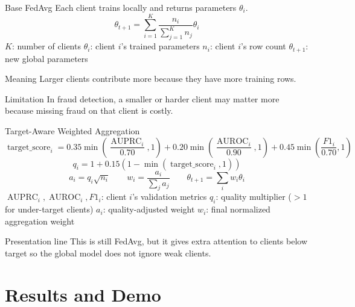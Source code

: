 \documentclass[aspectratio=169,10pt]{beamer}
\begin{document}
\begin{frame}{Base FedAvg}
  Each client trains locally and returns parameters \(\theta_i\).
  \[
    \theta_{t+1}
    =
    \sum_{i=1}^{K}
    \frac{n_i}{\sum_{j=1}^{K} n_j}
    \theta_i
  \]
  \footnotesize \(K\): number of clients \quad \(\theta_i\): client \(i\)'s trained parameters \quad \(n_i\): client \(i\)'s row count \quad \(\theta_{t+1}\): new global parameters
  \normalsize
  \begin{block}{Meaning}
    Larger clients contribute more because they have more training rows.
  \end{block}
  \begin{block}{Limitation}
    In fraud detection, a smaller or harder client may matter more because missing fraud on that client is costly.
  \end{block}
\end{frame}

\begin{frame}{Target-Aware Weighted Aggregation}
  \[
  \operatorname{target\_score}_i =
  0.35 \min\left(\frac{\operatorname{AUPRC}_i}{0.70},1\right)
  + 0.20 \min\left(\frac{\operatorname{AUROC}_i}{0.90},1\right)
  + 0.45 \min\left(\frac{F1_i}{0.70},1\right)
  \]
  \[
    q_i = 1 + 0.15(1-\min(\operatorname{target\_score}_i,1))
  \]
  \[
    a_i = q_i\sqrt{n_i}
    \qquad
    w_i = \frac{a_i}{\sum_j a_j}
    \qquad
    \theta_{t+1} = \sum_i w_i\theta_i
  \]
  \footnotesize \(\operatorname{AUPRC}_i,\operatorname{AUROC}_i,F1_i\): client \(i\)'s validation metrics \quad \(q_i\): quality multiplier (\(>1\) for under-target clients) \quad \(a_i\): quality-adjusted weight \quad \(w_i\): final normalized aggregation weight
  \normalsize
  \begin{block}{Presentation line}
    This is still FedAvg, but it gives extra attention to clients below target so the global model does not ignore weak clients.
  \end{block}
\end{frame}

\section{Results and Demo}
\end{document}
